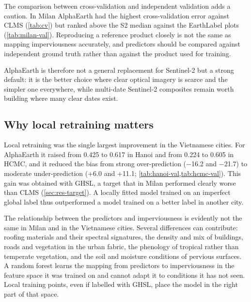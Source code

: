 The comparison between cross-validation and independent validation adds a
caution. In Milan AlphaEarth had the highest cross-validation error against
CLMS (\cref{tab:cv}) but ranked above the S2 median against the EarthLabel
plots (\cref{tab:milan-val}). Reproducing a reference product closely is not
the same as mapping imperviousness accurately, and predictors should be
compared against independent ground truth rather than against the product
used for training.

AlphaEarth is therefore not a general replacement for Sentinel-2 but a
strong default: it is the better choice where clear optical imagery is
scarce and the simpler one everywhere, while multi-date Sentinel-2
composites remain worth building where many clear dates exist.

\subsection{Why local retraining matters}
\label{sec:disc-local}

Local retraining was the single largest improvement in the Vietnamese
cities. For AlphaEarth it raised \Rsq{} from 0.425 to 0.617 in Hanoi and from
0.224 to 0.605 in HCMC, and it reduced the bias from strong over-prediction
($-$16.2 and $-$21.7\pp) to moderate under-prediction (+6.0 and +11.1\pp;
\cref{tab:hanoi-val,tab:hcmc-val}). This gain was obtained with GHSL, a
target that in Milan performed clearly worse than CLMS
(\cref{sec:res-target}). A locally fitted model trained on an imperfect
global label thus outperformed a model trained on a better label in another
city.

The relationship between the predictors and imperviousness is evidently not
the same in Milan and in the Vietnamese cities. Several differences can
contribute: roofing materials and their spectral signatures, the density
and mix of buildings, roads and vegetation in the urban fabric, the
phenology of tropical rather than temperate vegetation, and the soil and
moisture conditions of pervious surfaces. A random forest learns the
mapping from predictors to imperviousness in the feature space it was
trained on and cannot adapt it to conditions it has not seen. Local training
points, even if labelled with GHSL, place the model in the right part of
that space.

